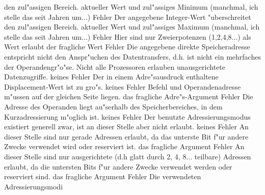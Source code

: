 \documentclass[12pt,a4paper,twoside]{report}
\begin{document}
\begin{description}
{                den zul"assigen Bereich.}
               {aktueller Wert und zul"assiges Minimum
	        (manchmal, ich stelle das seit Jahren um...)}
               {Fehler}
               {Der angegebene Integer-Wert "uberschreitet
                den zul"assigen Bereich.}
               {aktueller Wert und zul"assiges Maximum
	        (manchmal, ich stelle das seit Jahren um...)}
               {Fehler}
               {Hier sind nur Zweierpotenzen (1,2,4,8...)
                als Wert erlaubt}
               {der fragliche Wert}
               {Fehler}
               {Die angegebene direkte Speicheradresse
                entspricht nicht den Anspr"uchen des Datentransfers, d.h.
                ist nicht ein mehrfaches der Operandengr"o"se.  Nicht alle
                Prozessoren erlauben unausgerichtete Datenzugriffe.}
               {keines}
               {Fehler}
               {Der in einem Adre"sausdruck enthaltene
                Displacement-Wert ist zu gro"s.}
               {keines}
               {Fehler}
               {Befehl und Operandenadresse m"ussen
                auf der gleichen Seite liegen.}
               {das fragliche Adre"s-Argument}
               {Fehler}
               {Die Adresse des Operanden liegt au"serhalb des
                Speicherbereiches, in dem Kurzadressierung m"oglich ist.}
               {keines}
               {Fehler}
               {Der benutzte Adressierungsmodus existiert
                generell zwar, ist an dieser Stelle aber nicht erlaubt.}
               {keines}
               {Fehler}
               {An dieser Stelle sind nur gerade Adressen erlaubt,
                da das unterste Bit f"ur andere Zwecke verwendet wird
                oder reserviert ist.}
               {das fragliche Argument}
               {Fehler}
               {An dieser Stelle sind nur ausgerichtete
                (d.h glatt durch 2, 4, 8... teilbare) Adressen erlaubt,
                da die untersten Bits f"ur andere Zwecke verwendet werden
                oder reserviert sind.}
               {das fragliche Argument}
               {Fehler}
               {Die verwendeten Adressierungsmodi
}
\end{description}
\end{document}
